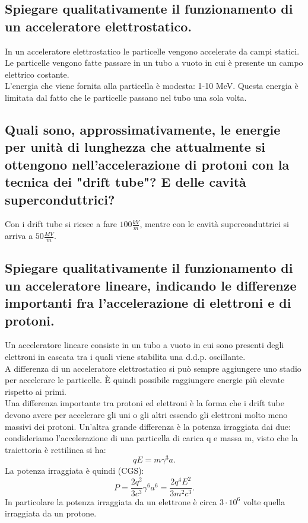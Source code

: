 \subsection[]{Spiegare qualitativamente il funzionamento di un acceleratore elettrostatico.}
\label{sec:3.a.18}
In un acceleratore elettrostatico le particelle vengono accelerate da campi statici. Le particelle vengono fatte passare in un tubo a vuoto in cui è presente un campo elettrico costante.\\ 
L'energia che viene fornita alla particella è modesta: 1-10 MeV. Questa energia è limitata dal fatto che le particelle passano nel tubo una sola volta. 

\subsection[]{Quali sono, approssimativamente, le energie per unità di lunghezza che attualmente si ottengono nell’accelerazione di protoni con la tecnica dei "drift tube"? E delle cavità superconduttrici?}
\label{sec:3.a.19}
Con i drift tube si riesce a fare $ 100 \frac{kV}{m}$, mentre con le cavità superconduttrici si arriva a $ 50 \frac{MV}{m}$. 


\subsection[]{Spiegare qualitativamente il funzionamento di un acceleratore lineare, indicando le differenze importanti fra l’accelerazione di elettroni e di protoni.}
\label{sec:3.a.20}
Un acceleratore lineare consiste in un tubo a vuoto in cui sono presenti degli elettroni in cascata tra i quali viene stabilita una d.d.p. oscillante. \\
A differenza di un acceleratore elettrostatico si può sempre aggiungere uno stadio per accelerare le particelle. È quindi possibile raggiungere energie più elevate rispetto ai primi. \\
Una differenza importante tra protoni ed elettroni è la forma che i drift tube devono avere per accelerare gli uni o gli altri essendo gli elettroni molto meno massivi dei protoni. 
Un'altra grande differenza è la potenza irraggiata dai due: condideriamo l'accelerazione di una particella di carica q e massa m, visto che la traiettoria è rettilinea si ha:
\[
	qE=m \gamma^3a	
.\]
La potenza irraggiata è quindi (CGS):
\[
	P= \frac{2q^2}{3c^3}\gamma^{6}a^{6}=\frac{2q^4E^2}{3m^2c^3}	
.\]
In particolare la potenza irraggiata da un elettrone è circa $3 \cdot 10^{6} $ volte quella irraggiata da un protone.
